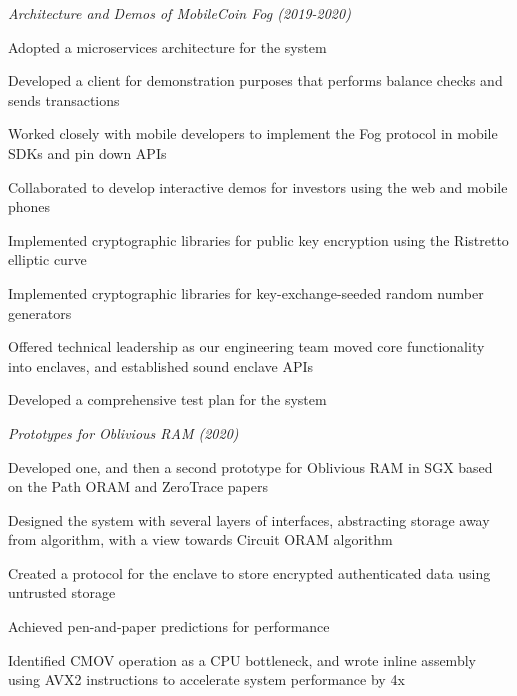 \documentclass[margin,line]{resume}
\begin{document}
\begin{resume}
    \textsl{Architecture and Demos of MobileCoin Fog (2019-2020)}
    \begin{list2}
    \item{Adopted a microservices architecture for the system}
    \item{Developed a client for demonstration purposes that performs balance checks and sends transactions}
    \item{Worked closely with mobile developers to implement the Fog protocol in mobile SDKs and pin down APIs}
    \item{Collaborated to develop interactive demos for investors using the web and mobile phones}
    \item{Implemented cryptographic libraries for public key encryption using the Ristretto elliptic curve}
    \item{Implemented cryptographic libraries for key-exchange-seeded random number generators}
    \item{Offered technical leadership as our engineering team moved core functionality into enclaves, and established sound enclave APIs}
    \item{Developed a comprehensive test plan for the system}
    \end{list2}

    \textsl{Prototypes for Oblivious RAM (2020)}
    \begin{list2}
    \item{Developed one, and then a second prototype for Oblivious RAM in SGX based on the Path ORAM and ZeroTrace papers}
    \item{Designed the system with several layers of interfaces, abstracting storage away from algorithm, with a view towards Circuit ORAM algorithm}
    \item{Created a protocol for the enclave to store encrypted authenticated data using untrusted storage}
    \item{Achieved pen-and-paper predictions for performance}
    \item{Identified CMOV operation as a CPU bottleneck, and wrote inline assembly using AVX2 instructions to accelerate system performance by 4x}
    \end{list2}


\end{resume}
\end{document}

